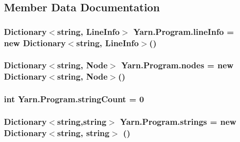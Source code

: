 \subsection{Member Data Documentation}
\hypertarget{a00126_a0d4da395947767b4a1eaaff8a9842adc}{
\subsubsection[{line\-Info}]{\setlength{\rightskip}{0pt plus 5cm}Dictionary$<$string, {\bf Line\-Info}$>$ Yarn.\-Program.\-line\-Info = new Dictionary$<$string, {\bf Line\-Info}$>$()\hspace{0.3cm}{\ttfamily [package]}}}\label{a00126_a0d4da395947767b4a1eaaff8a9842adc}
\hypertarget{a00126_a3f4928a577c88263ad016be259b175c4}{
\subsubsection[{nodes}]{\setlength{\rightskip}{0pt plus 5cm}Dictionary$<$string, {\bf Node}$>$ Yarn.\-Program.\-nodes = new Dictionary$<$string, {\bf Node}$>$()\hspace{0.3cm}{\ttfamily [package]}}}\label{a00126_a3f4928a577c88263ad016be259b175c4}
\hypertarget{a00126_a8ef1d10094ef00311aade6715ba78ec7}{
\subsubsection[{string\-Count}]{\setlength{\rightskip}{0pt plus 5cm}int Yarn.\-Program.\-string\-Count = 0\hspace{0.3cm}{\ttfamily [private]}}}\label{a00126_a8ef1d10094ef00311aade6715ba78ec7}
\hypertarget{a00126_a91518fda7e41bf573f66c6946dd3b4cb}{
\subsubsection[{strings}]{\setlength{\rightskip}{0pt plus 5cm}Dictionary$<$string,string$>$ Yarn.\-Program.\-strings = new Dictionary$<$string, string$>$ ()\hspace{0.3cm}{\ttfamily [package]}}}\label{a00126_a91518fda7e41bf573f66c6946dd3b4cb}


